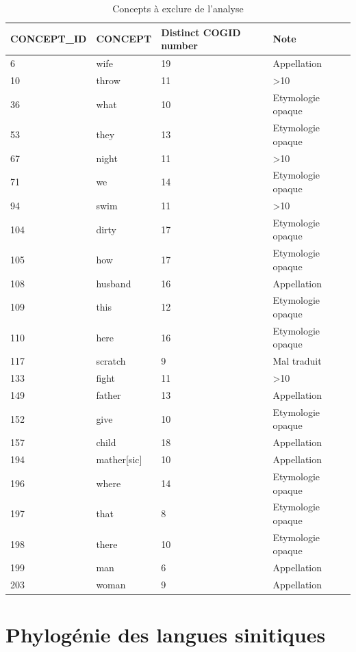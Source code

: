 \documentclass{scrbook}
\newcounter{c}[subsubsection]
\begin{document}
\begin{sloppypar}
\begin{table}[htbp]
  \centering
    \begin{tabular}{llll}
    \toprule
    \multicolumn{1}{l}{CONCEPT\_ID} & CONCEPT & \multicolumn{1}{l}{Distinct COGID number} & Note \\
    \midrule
    6     & wife  & 19    & Appellation \\
    10    & throw & 11    & >10 \\
    36    & what  & 10    & Etymologie opaque \\
    53    & they  & 13    & Etymologie opaque \\
    67    & night & 11    & >10 \\
    71    & we    & 14    & Etymologie opaque \\
    94    & swim  & 11    & >10 \\
    104   & dirty & 17    & Etymologie opaque \\
    105   & how   & 17    & Etymologie opaque \\
    108   & husband & 16    & Appellation \\
    109   & this  & 12    & Etymologie opaque \\
    110   & here  & 16    & Etymologie opaque \\
    117   & scratch & 9     & Mal traduit \\
    133   & fight & 11    & >10 \\
    149   & father & 13    & Appellation \\
    152   & give  & 10    & Etymologie opaque \\
    157   & child & 18    & Appellation \\
    194   & mather[sic] & 10    & Appellation \\
    196   & where & 14    & Etymologie opaque \\
    197   & that  & 8     & Etymologie opaque \\
    198   & there & 10    & Etymologie opaque \\
    199   & man   & 6     & Appellation \\
    203   & woman & 9     & Appellation \\
    \bottomrule
    \end{tabular}%
  \caption{Concepts à exclure de l'analyse}
  \label{tab:concept_excl}%
\end{table}

\chapter{Phylogénie des langues sinitiques}\label{phylo}

\end{sloppypar}
\end{document}
